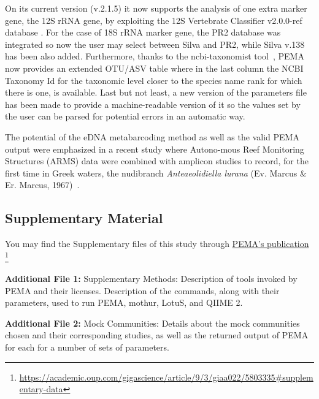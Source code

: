       On its current version (v.2.1.5) it now supports the analysis of one extra
      marker gene, the 12S rRNA gene, by exploiting the 12S Vertebrate Classifier v2.0.0-ref database \citep{teresita_m_porter_2021_5157047}.
      For the case of 18S rRNA marker gene, the PR2 database \citep{guillou2012protist} was integrated 
      so now the user may select between Silva and PR2,
      while Silva v.138 has been also added. 
      Furthermore, thanks to the ncbi-taxonomist tool~\citep{buchmann2020collecting}, 
      PEMA now provides an extended OTU/ASV table where in the last column the NCBI Taxonomy Id 
      for the taxonomic level closer to the species name rank for which there is one, is available.
      Last but not least, a new version of the parameters file has been made to provide a machine-readable version 
      of it so the values set by the user can be parsed for potential errors in an automatic way. 

      The potential of the eDNA metabarcoding method as well as the 
      valid PEMA output
      were emphasized in a recent study where
      Autono-mous  Reef  Monitoring  Structures (ARMS) data 
      were combined with amplicon studies to 
      record, for the first time in Greek waters, the nudibranch 
      \textit{Anteaeolidiella lurana} (Ev. Marcus \& Er. Marcus, 1967)~\citep{bariche2020new}. 
   


      \subsection*{Supplementary Material}

      You may find the Supplementary files of this study through 
      \href{https://academic.oup.com/gigascience/article/9/3/giaa022/5803335#supplementary-data}{PEMA's publication}
      \footnote{\href{https://academic.oup.com/gigascience/article/9/3/giaa022/5803335\#supplementary-data}{https://academic.oup.com/gigascience/article/9/3/giaa022/5803335\#supplementary-data}}


      \textbf{Additional File 1:} Supplementary Methods: Description of tools invoked by PEMA and their licenses. Description of the commands, along with their parameters, used to run PEMA, mothur, LotuS, and QIIME 2.

      \textbf{Additional File 2:} Mock Communities: Details about the mock communities chosen and their corresponding studies, as well as the returned output of PEMA for each for a number of sets of parameters.

